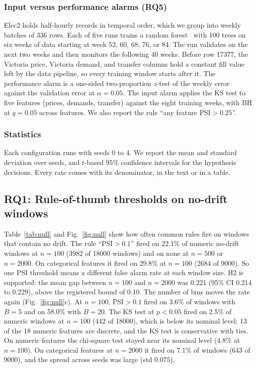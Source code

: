 \documentclass[journal]{IEEEtran}
\begin{document}
\subsubsection{Input versus performance alarms (RQ5)}
Elec2 holds half-hourly records in temporal order, which we group into weekly batches of 336 rows. Each of five runs trains a random forest~\cite{breiman2001,pedregosa2011} with 100 trees on six weeks of data starting at week 52, 60, 68, 76, or 84. The run validates on the next two weeks and then monitors the following 40 weeks. Before row 17377, the Victoria price, Victoria demand, and transfer columns hold a constant fill value left by the data pipeline, so every training window starts after it. The performance alarm is a one-sided two-proportion $z$-test of the weekly error against the validation error at $\alpha=0.05$. The input alarm applies the KS test to five features (prices, demands, transfer) against the eight training weeks, with BH at $q=0.05$ across features. We also report the rule ``any feature PSI${}>0.25$''.

\subsubsection{Statistics}
Each configuration runs with seeds 0 to 4. We report the mean and standard deviation over seeds, and $t$-based 95\% confidence intervals for the hypothesis decisions. Every rate comes with its denominator, in the text or in a table.

\subsection{RQ1: Rule-of-thumb thresholds on no-drift windows}
\label{sec:res-null}

Table~\ref{tab:null} and Fig.~\ref{fig:null} show how often common rules fire on windows that contain no drift. The rule ``PSI${}>0.1$'' fired on 22.1\% of numeric no-drift windows at $n=100$ (3982 of 18000 windows) and on none at $n=500$ or $n=2000$. On categorical features it fired on 29.8\% at $n=100$ (2684 of 9000). So one PSI threshold means a different false alarm rate at each window size. H2 is supported: the mean gap between $n=100$ and $n=2000$ was 0.221 (95\% CI 0.214 to 0.229), above the registered bound of 0.10. The number of bins moves the rate again (Fig.~\ref{fig:null}c). At $n=100$, PSI${}>0.1$ fired on 3.6\% of windows with $B=5$ and on 58.0\% with $B=20$. The KS test at $p<0.05$ fired on 2.5\% of numeric windows at $n=100$ (442 of 18000), which is below its nominal level; 13 of the 18 numeric features are discrete, and the KS test is conservative with ties. On numeric features the chi-square test stayed near its nominal level (4.8\% at $n=100$). On categorical features at $n=2000$ it fired on 7.1\% of windows (643 of 9000), and the spread across seeds was large (std 0.075).
\end{document}
